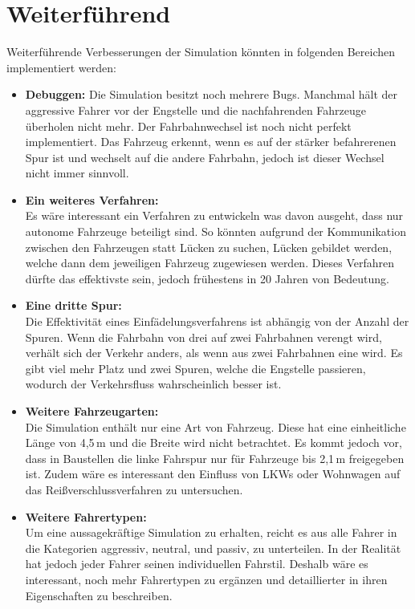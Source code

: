 \chapter{Weiterführend}
Weiterführende Verbesserungen der Simulation könnten in folgenden Bereichen implementiert werden:
\begin{itemize}
	\item \textbf{Debuggen:}
Die Simulation besitzt noch mehrere Bugs. Manchmal hält der aggressive Fahrer vor der Engstelle und die nachfahrenden Fahrzeuge überholen nicht mehr.
Der Fahrbahnwechsel ist noch nicht perfekt implementiert. Das Fahrzeug erkennt, wenn es auf der stärker befahrerenen Spur ist und wechselt auf die andere Fahrbahn, jedoch ist dieser Wechsel nicht immer sinnvoll.
\item \textbf{Ein weiteres Verfahren:}\\
Es wäre interessant ein Verfahren zu entwickeln was davon ausgeht, dass nur autonome Fahrzeuge beteiligt sind. So könnten aufgrund der Kommunikation zwischen den Fahrzeugen statt Lücken zu suchen, Lücken  gebildet werden, welche dann dem jeweiligen Fahrzeug zugewiesen werden. Dieses Verfahren dürfte das effektivste sein, jedoch frühestens in 20 Jahren von Bedeutung.

\item \textbf{Eine dritte Spur:}\\
Die Effektivität eines Einfädelungsverfahrens ist abhängig von der Anzahl der Spuren. Wenn die Fahrbahn von drei auf zwei Fahrbahnen verengt wird, verhält sich der Verkehr anders, als wenn aus zwei Fahrbahnen eine wird. Es gibt viel mehr Platz und zwei Spuren, welche die Engstelle passieren, wodurch der Verkehrsfluss wahrscheinlich besser ist.

\item \textbf{Weitere Fahrzeugarten:}\\
Die Simulation enthält nur eine Art von Fahrzeug. Diese hat eine einheitliche Länge von 4,5\,m und die Breite wird nicht betrachtet. Es kommt jedoch vor, dass in Baustellen die linke Fahrspur nur für Fahrzeuge bis 2,1\,m freigegeben ist.
Zudem wäre es interessant den Einfluss von LKWs oder Wohnwagen auf das Reißverschlussverfahren zu untersuchen.

\item \textbf{Weitere Fahrertypen:}\\
Um eine aussagekräftige Simulation zu erhalten, reicht es aus alle Fahrer in die Kategorien aggressiv, neutral, und passiv, zu unterteilen. In der Realität hat jedoch jeder Fahrer seinen individuellen Fahrstil. Deshalb wäre es interessant, noch mehr Fahrertypen zu ergänzen und detaillierter in ihren Eigenschaften zu beschreiben.


\end{itemize}
